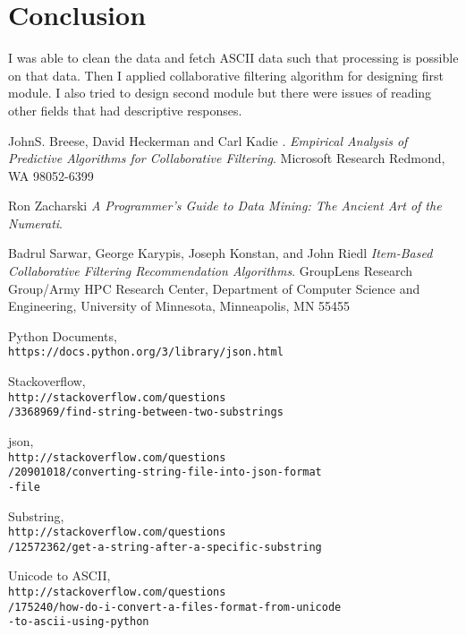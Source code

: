 \documentclass[conference]{IEEEtran}
\begin{document}
\section{Conclusion}

I was able to clean the data and fetch ASCII data such that processing is possible on that data. Then I applied  collaborative filtering algorithm for designing first module. I also tried to design second module but there were issues of reading other fields that had descriptive responses.   

\begin{thebibliography}{9}
JohnS. Breese, David Heckerman and Carl Kadie . 
\textit{Empirical Analysis of  Predictive Algorithms for Collaborative Filtering}. 
Microsoft Research Redmond, WA 98052-6399  

Ron Zacharski
\textit{A Programmer’s Guide to Data Mining: The Ancient Art of the Numerati}. 
 
Badrul Sarwar, George Karypis, Joseph Konstan, and John Riedl
\textit{Item-Based Collaborative Filtering Recommendation Algorithms}. 
GroupLens Research Group/Army HPC Research Center, Department of Computer Science and Engineering, University of Minnesota, Minneapolis, MN 55455

Python Documents,
\\\texttt{https://docs.python.org/3/library/json.html}

Stackoverflow,
\\\texttt{http://stackoverflow.com/questions\\/3368969/find-string-between-two-substrings}

json,
\\\texttt{http://stackoverflow.com/questions\\/20901018/converting-string-file-into-json-format\\-file}

Substring,
\\\texttt{http://stackoverflow.com/questions\\/12572362/get-a-string-after-a-specific-substring}

Unicode to ASCII,
\\\texttt{http://stackoverflow.com/questions\\/175240/how-do-i-convert-a-files-format-from-unicode\\-to-ascii-using-python}

\end{thebibliography}
\end{document}
